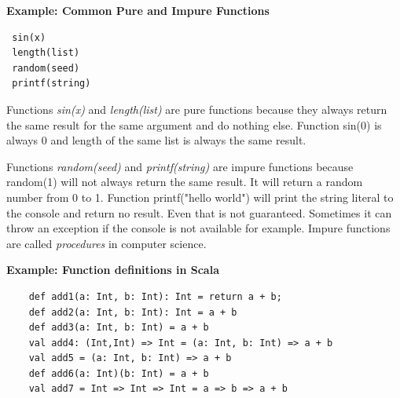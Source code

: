 \documentclass[12pt,twoside,a4paper]{report}
\begin{document}
\textbf{Example: Common Pure and Impure Functions}

\begin{lstlisting}
 sin(x)
 length(list)
 random(seed)
 printf(string)
\end{lstlisting}

Functions \emph{sin(x)} and \emph{length(list)} are pure functions because they always return the same result for the same argument and do nothing else. Function sin(0) is always 0 and length of the same list is always the same result.\par
Functions \emph{random(seed)} and \emph{printf(string)} are impure functions because random(1) will not always return the same result. It will return a random number from 0 to 1. Function printf("hello world") will print the string literal to the console and return no result. Even that is not guaranteed. Sometimes it can throw an exception if the console is not available for example. Impure functions are called \emph{procedures} in computer science.

\textbf{Example: Function definitions in Scala}

\begin{lstlisting}
	def add1(a: Int, b: Int): Int = return a + b;
	def add2(a: Int, b: Int): Int = a + b
	def add3(a: Int, b: Int) = a + b
	val add4: (Int,Int) => Int = (a: Int, b: Int) => a + b
	val add5 = (a: Int, b: Int) => a + b
	def add6(a: Int)(b: Int) = a + b
	val add7 = Int => Int => Int = a => b => a + b
\end{lstlisting}
\end{document}
